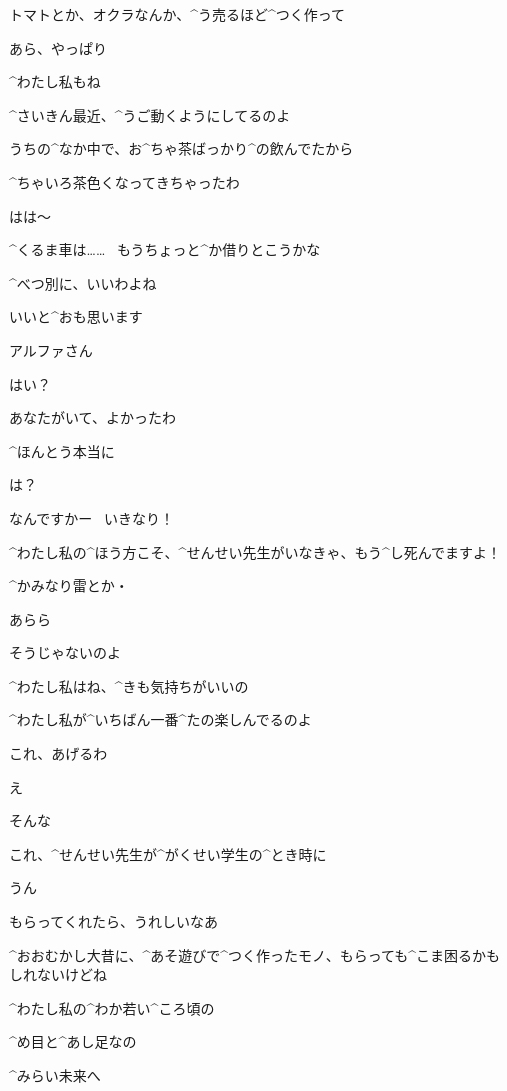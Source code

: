\Alpha トマトとか、オクラなんか、^{う}{売}るほど^{つく}{作}って

\Sensei あら、やっぱり

\Sensei ^{わたし}{私}もね

\Sensei ^{さいきん}{最近}、^{うご}{動}くようにしてるのよ

\page[23]
\Sensei うちの^{なか}{中}で、お^{ちゃ}{茶}ばっかり^{の}{飲}んでたから

\Sensei ^{ちゃいろ}{茶色}くなってきちゃったわ

\Alpha はは〜

\Sensei ^{くるま}{車}は……
\ もうちょっと^{か}{借}りとこうかな

\Sensei ^{べつ}{別}に、いいわよね

\Alpha いいと^{おも}{思}います

\page[25]
\Sensei アルファさん

\Alpha はい？

\page[26]
\Sensei あなたがいて、よかったわ

\Sensei ^{ほんとう}{本当}に

\Alpha は？

\page[27]
\Alpha なんですかー
\ いきなり！

\Alpha ^{わたし}{私}の^{ほう}{方}こそ、^{せんせい}{先生}がいなきゃ、もう^{し}{死}んでますよ！

\Alpha ^{かみなり}{雷}とか・

\Sensei あらら

\Sensei そうじゃないのよ

\Sensei ^{わたし}{私}はね、^{きも}{気持}ちがいいの

\Sensei ^{わたし}{私}が^{いちばん}{一番}^{たの}{楽}しんでるのよ

\page[28]
\Sensei これ、あげるわ

\Alpha え

\page[29]
\Alpha そんな

\Alpha これ、^{せんせい}{先生}が^{がくせい}{学生}の^{とき}{時}に

\Sensei うん

\Sensei もらってくれたら、うれしいなあ

\Sensei ^{おおむかし}{大昔}に、^{あそ}{遊}びで^{つく}{作}ったモノ、もらっても^{こま}{困}るかもしれないけどね

\Sensei ^{わたし}{私}の^{わか}{若}い^{ころ}{頃}の

\Sensei ^{め}{目}と^{あし}{足}なの

\page[30]
\Sensei ^{みらい}{未来}へ

